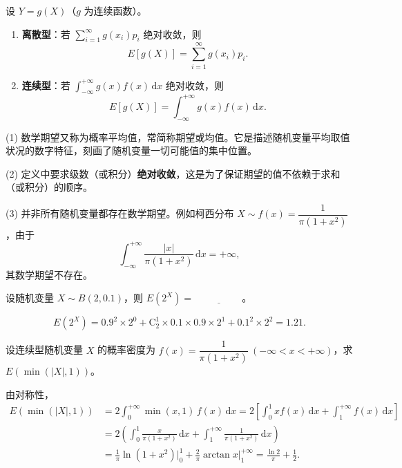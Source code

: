 \documentclass[lang=cn,11pt]{elegantbook}
\begin{document}
\begin{definition}[随机变量函数的期望] \label{def:function-expectation}
设 \(Y = g(X)\)（\(g\) 为连续函数）。
\begin{enumerate}
    \item \textbf{离散型}：若 \(\sum\limits_{i=1}^{\infty} g(x_i) p_i\) 绝对收敛，则
    \[
    E[g(X)] = \sum_{i=1}^{\infty} g(x_i) p_i.
    \]
    \item \textbf{连续型}：若 \(\int_{-\infty}^{+\infty} g(x) f(x)\,\mathrm{d}x\) 绝对收敛，则
    \[
    E[g(X)] = \int_{-\infty}^{+\infty} g(x) f(x)\,\mathrm{d}x.
    \]
\end{enumerate}
\end{definition}

\begin{note}
(1) 数学期望又称为概率平均值，常简称期望或均值。它是描述随机变量平均取值状况的数字特征，刻画了随机变量一切可能值的集中位置。\par
(2) 定义中要求级数（或积分）\textbf{绝对收敛}，这是为了保证期望的值不依赖于求和（或积分）的顺序。\par
(3) 并非所有随机变量都存在数学期望。例如柯西分布 \(X\sim f(x)=\dfrac{1}{\pi(1+x^2)}\)，由于
\[
\int_{-\infty}^{+\infty}\frac{|x|}{\pi(1+x^2)}\,\mathrm{d}x = +\infty,
\]
其数学期望不存在。
\end{note}



\begin{exercise}\label{exer:4-1-2x}
设随机变量 \(X \sim B(2, 0.1)\)，则 \(E(2^X) =\,\underline{\hspace{2cm}}\)。
\end{exercise}

\begin{solution}
\[
E(2^X) = 0.9^2 \times 2^0 + \mathrm{C}_2^1 \times 0.1 \times 0.9 \times 2^1 + 0.1^2 \times 2^2 = 1.21.
\]
\end{solution}

\begin{exercise}\label{exer:4-s14-cauchymin}
设连续型随机变量 \(X\) 的概率密度为 \(f(x) = \dfrac{1}{\pi(1+x^2)}\ (-\infty < x < +\infty)\)，求 \(E(\min(|X|,1))\)。
\end{exercise}

\begin{solution}
由对称性，
\[
\begin{aligned}
E(\min(|X|,1)) &= 2\int_0^{+\infty}\min(x,1)\,f(x)\,\mathrm{d}x = 2\left[\int_0^1 x f(x)\,\mathrm{d}x + \int_1^{+\infty} f(x)\,\mathrm{d}x\right] \\
&= 2\left(\int_0^1 \frac{x}{\pi(1+x^2)}\,\mathrm{d}x + \int_1^{+\infty}\frac{1}{\pi(1+x^2)}\,\mathrm{d}x\right) \\
&= \frac{1}{\pi}\ln(1+x^2)\Big|_0^1 + \frac{2}{\pi}\arctan x\Big|_1^{+\infty} = \frac{\ln 2}{\pi} + \frac{1}{2}.
\end{aligned}
\]
\end{solution}
\end{document}
